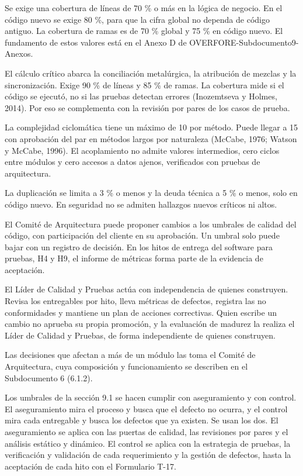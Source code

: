 \documentclass[subdoc]{../../comun/overfore}
\begin{document}
Se exige una cobertura de líneas de 70 \% o más en la lógica de negocio. En el código nuevo se exige 80 \%, para que la cifra global no dependa de código antiguo. La cobertura de ramas es de 70 \% global y 75 \% en código nuevo. El fundamento de estos valores está en el Anexo D de OVERFORE-Subdocumento9-Anexos.

El cálculo crítico abarca la conciliación metalúrgica, la atribución de mezclas y la sincronización. Exige 90 \% de líneas y 85 \% de ramas. La cobertura mide si el código se ejecutó, no si las pruebas detectan errores (Inozemtseva y Holmes, 2014). Por eso se complementa con la revisión por pares de los casos de prueba.

La complejidad ciclomática tiene un máximo de 10 por método. Puede llegar a 15 con aprobación del par en métodos largos por naturaleza (McCabe, 1976; Watson y McCabe, 1996). El acoplamiento no admite valores intermedios, cero ciclos entre módulos y cero accesos a datos ajenos, verificados con pruebas de arquitectura.

La duplicación se limita a 3 \% o menos y la deuda técnica a 5 \% o menos, solo en código nuevo. En seguridad no se admiten hallazgos nuevos críticos ni altos.

El Comité de Arquitectura puede proponer cambios a los umbrales de calidad del código, con participación del cliente en su aprobación. Un umbral solo puede bajar con un registro de decisión. En los hitos de entrega del software para pruebas, H4 y H9, el informe de métricas forma parte de la evidencia de aceptación.

El Líder de Calidad y Pruebas actúa con independencia de quienes construyen. Revisa los entregables por hito, lleva métricas de defectos, registra las no conformidades y mantiene un plan de acciones correctivas. Quien escribe un cambio no aprueba su propia promoción, y la evaluación de madurez la realiza el Líder de Calidad y Pruebas, de forma independiente de quienes construyen.

Las decisiones que afectan a más de un módulo las toma el Comité de Arquitectura, cuya composición y funcionamiento se describen en el Subdocumento 6 (6.1.2).

Los umbrales de la sección 9.1 se hacen cumplir con aseguramiento y con control. El aseguramiento mira el proceso y busca que el defecto no ocurra, y el control mira cada entregable y busca los defectos que ya existen. Se usan los dos. El aseguramiento se aplica con las puertas de calidad, las revisiones por pares y el análisis estático y dinámico. El control se aplica con la estrategia de pruebas, la verificación y validación de cada requerimiento y la gestión de defectos, hasta la aceptación de cada hito con el Formulario T-17.
\end{document}
